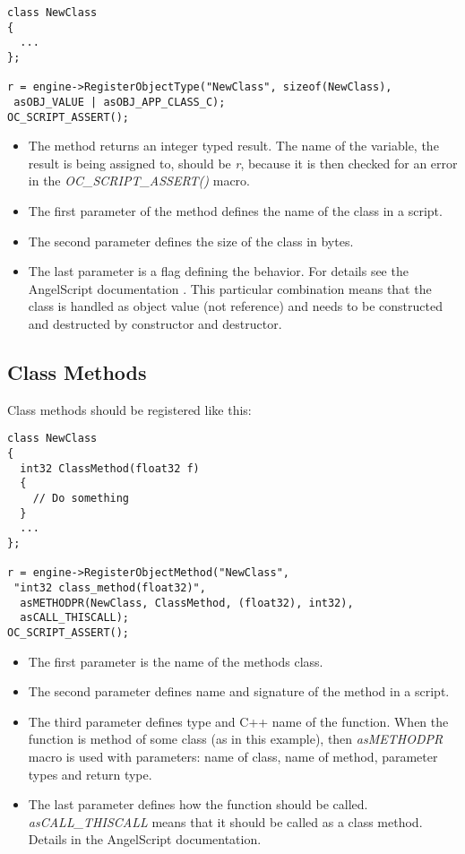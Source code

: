\documentclass[a4paper, 12pt]{report}
\begin{document}
\footnotesize 
\begin{verbatim}
class NewClass
{
  ...
};

r = engine->RegisterObjectType("NewClass", sizeof(NewClass),
 asOBJ_VALUE | asOBJ_APP_CLASS_C);
OC_SCRIPT_ASSERT();
\end{verbatim}
\normalsize

\begin{itemize}
\item
The method returns an integer typed result. The name of the variable, the result is being assigned to, should be \emph{r}, because it is then checked for an error in the \emph{OC\_SCRIPT\_ASSERT()} macro.

\item
The first parameter of the method defines the name of the class in a script.

\item
The second parameter defines the size of the class in bytes.

\item
The last parameter is a flag defining the behavior. For details see the AngelScript documentation \cite{angelscript}. This particular combination means that the class is handled as object value (not reference) and needs to be constructed and destructed by constructor and destructor.
\end{itemize}

\subsection{Class Methods}
Class methods should be registered like this:

\footnotesize 
\begin{verbatim}
class NewClass
{
  int32 ClassMethod(float32 f)
  {
    // Do something
  }
  ...
};

r = engine->RegisterObjectMethod("NewClass",
 "int32 class_method(float32)", 
  asMETHODPR(NewClass, ClassMethod, (float32), int32),
  asCALL_THISCALL);
OC_SCRIPT_ASSERT();
\end{verbatim}
\normalsize

\begin{itemize}
\item
The first parameter is the name of the methods class.
\item
The second parameter defines name and signature of the method in a script.
\item
The third parameter defines type and C++ name of the function. When the function is method of some class (as in this example), then \emph{asMETHODPR} macro is used with parameters: name of class, name of method, parameter types and return type.
\item
The last parameter defines how the function should be called. \emph{asCALL\_THISCALL} means that it should be called as a class method. Details in the AngelScript documentation\cite{angelscript}.
\end{itemize}
\end{document}
